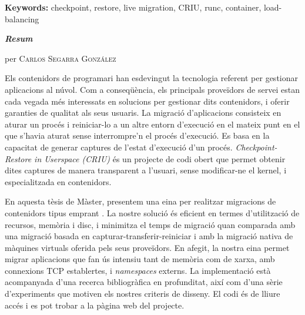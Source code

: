 \vspace{0.5cm}

\textbf{Keywords:} checkpoint, restore, live migration, CRIU, runc, container, load-balancing

\vfill
\pagebreak

\vspace*{1.5cm}
\begin{center}
    \LARGE
    \textit{\textbf{Resum}} 

    \vspace{0.5cm}

    \large
    \textbf{\titleEN}

    per \textsc{Carlos Segarra Gonz\'alez}
\end{center}

\vspace{0.5cm}

\normalsize

Els contenidors de programari han esdevingut la tecnologia referent per gestionar aplicacions al n\'uvol.
Com a conseq\"u\`encia, els principals prove\"idors de servei estan cada vegada m\'es interessats en solucions per gestionar dits contenidors, i oferir garanties de qualitat als seus usuaris.
La migraci\'o d'aplicacions consisteix en aturar un proc\'es i reiniciar-lo a un altre entorn d'execuci\'o en el mateix punt en el que s'havia aturat sense interrompre'n el proc\'es d'execuci\'o.
Es basa en la capacitat de generar captures de l'estat d'execuci\'o d'un proc\'es.
\textit{Checkpoint-Restore in Userspace (CRIU)} \'es un projecte de codi obert que permet obtenir dites captures de manera transparent a l'usuari, sense modificar-ne el kernel, i especialitzada en contenidors.

En aquesta t\`esis de M\`aster, presentem una eina per realitzar migracions de contenidors tipus \runc emprant \criu.
La nostre soluci\'o \'es eficient en termes d'utilitzaci\'o de recursos, mem\`oria i disc, i minimitza el temps de migraci\'o quan comparada amb una migraci\'o basada en capturar-transferir-reiniciar i amb la migraci\'o nativa de m\`aquines virtuals oferida pels seus prove\"idors.
En afegit, la nostra eina permet migrar aplicacions que fan \'us intensiu tant de mem\`oria com de xarxa, amb connexions TCP establertes, i \textit{namespaces} externs.
La implementaci\'o est\`a acompanyada d'una recerca bibliogr\`afica en profunditat, aix\'i com d'una s\`erie d'experiments que motiven els nostres criteris de disseny.
El codi \'es de lliure acc\'es i es pot trobar a la p\`agina web del projecte.

